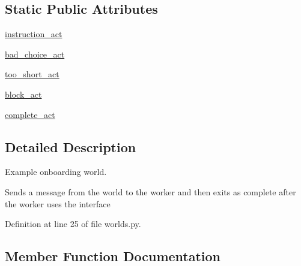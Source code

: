 \subsection*{Static Public Attributes}
\begin{DoxyCompactItemize}
\item 
\hyperlink{classlight__chats_1_1worlds_1_1LightChatOnboardingWorld_ac58184f481cddc78dfb2909d556d3e33}{instruction\+\_\+act}
\item 
\hyperlink{classlight__chats_1_1worlds_1_1LightChatOnboardingWorld_a49379d531932e29b9c46e39f58ba4b3f}{bad\+\_\+choice\+\_\+act}
\item 
\hyperlink{classlight__chats_1_1worlds_1_1LightChatOnboardingWorld_a453d8cca9b845c1644aba754fb6d4395}{too\+\_\+short\+\_\+act}
\item 
\hyperlink{classlight__chats_1_1worlds_1_1LightChatOnboardingWorld_adcd8a5e6c547a238d4997192ba578d13}{block\+\_\+act}
\item 
\hyperlink{classlight__chats_1_1worlds_1_1LightChatOnboardingWorld_a6b842c3f069204e081873dc41d349b93}{complete\+\_\+act}
\end{DoxyCompactItemize}


\subsection{Detailed Description}
\begin{DoxyVerb}Example onboarding world.

Sends a message from the world to the worker and then exits as complete after the
worker uses the interface
\end{DoxyVerb}
 

Definition at line 25 of file worlds.\+py.



\subsection{Member Function Documentation}
\mbox{\label{classlight__chats_1_1worlds_1_1LightChatOnboardingWorld_a0f913f08e74b21ad1d6b04c302e38850}} 
